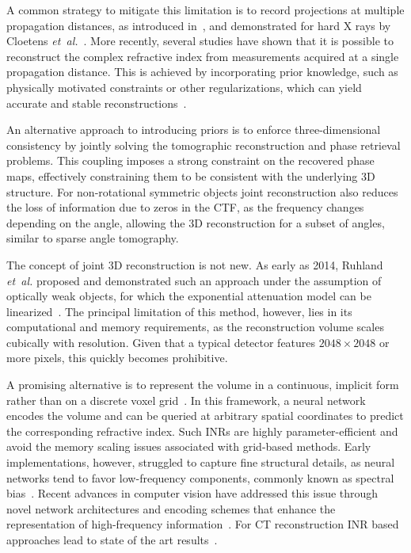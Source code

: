 \documentclass{article}
\begin{document}
A common strategy to mitigate this limitation is to record projections at multiple propagation distances, as introduced in~\cite{Misell_1973},
and demonstrated for hard X rays by Cloetens \textit{et~al.}~\cite{cloetensHolotomographyQuantitativePhase1999a}.
More recently, several studies have shown that it is possible to reconstruct the complex refractive index from measurements acquired at a single propagation distance.
This is achieved by incorporating prior knowledge, such as physically motivated constraints or other regularizations, which can yield accurate and stable reconstructions~\cite{doraArtifactsuppressingReconstructionStrongly2024,fienupReconstructionSupportObject1982,wittwerPhaseRetrievalFramework2022}.

An alternative approach to introducing priors is to enforce three-dimensional consistency by jointly solving the tomographic reconstruction and phase retrieval problems.
This coupling imposes a strong constraint on the recovered phase maps, effectively constraining them to be consistent with the underlying 3D structure.
For non-rotational symmetric objects joint reconstruction also reduces the loss of information due to zeros in the CTF, as the frequency changes depending on the angle, allowing the 3D reconstruction for a subset of angles, similar to sparse angle tomography.

The concept of joint 3D reconstruction is not new.
As early as 2014, Ruhland \textit{et~al.} proposed and demonstrated such an approach under the assumption of optically weak objects, for which the exponential attenuation model can be linearized~\cite{ruhlandtThreedimensionalPhaseRetrieval2014,ruhlandtThreedimensionalPropagationNearfield2016a}.
The principal limitation of this method, however, lies in its computational and memory requirements, as the reconstruction volume scales cubically with resolution.
Given that a typical detector features $2048 \times 2048$ or more pixels, this quickly becomes prohibitive.

A promising alternative is to represent the volume in a continuous, implicit form rather than on a discrete voxel grid~\cite{mildenhallNeRFRepresentingScenes2020a}.
In this framework, a neural network encodes the volume and can be queried at arbitrary spatial coordinates to predict the corresponding refractive index.
Such INRs are highly parameter-efficient and avoid the memory scaling issues associated with grid-based methods.
Early implementations, however, struggled to capture fine structural details, as neural networks tend to favor low-frequency components, commonly known as spectral bias~\cite{rahamanSpectralBiasNeural2019}.
Recent advances in computer vision have addressed this issue through novel network architectures and encoding schemes that enhance the representation of high-frequency information~\cite{mildenhallNeRFRepresentingScenes2020a,mullerInstantNeuralGraphics2022}.
For CT reconstruction INR based approaches lead to state of the art results~\cite{essakineWhereWeStand2025,zhaNAFNeuralAttenuation2022a}.
\end{document}
